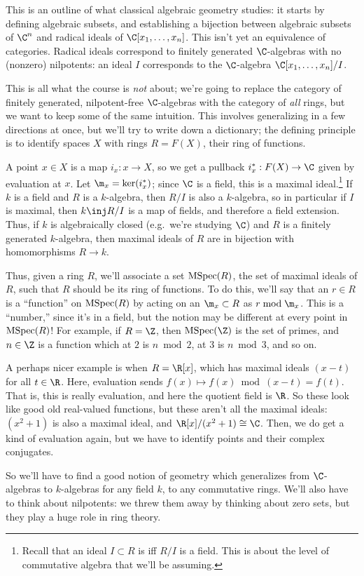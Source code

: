 This is an outline of what classical algebraic geometry studies: it starts by defining algebraic subsets, and
establishing a bijection between algebraic subsets of \(\C^n\) and radical ideals of \(\C[x_1,\dots,x_n]\). This
isn't yet an equivalence of categories. Radical ideals correspond to finitely generated \(\C\)-algebras with no
(nonzero) nilpotents: an ideal \(I\) corresponds to the \(\C\)-algebra \(\C[x_1,\dots,x_n]/I\).

This is all what the course is \emph{not} about; we're going to replace the category of finitely generated,
nilpotent-free \(\C\)-algebras with the category of \emph{all} rings, but we want to keep some of the same
intuition. This involves generalizing in a few directions at once, but we'll try to write down a dictionary; the
defining principle is to identify spaces \(X\) with rings \(R = F(X)\), their ring of functions.

A point \(x\in X\) is a map \(i_x:x\to X\), so we get a pullback \(i_x^*:F(X)\to\C\) given by evaluation at \(x\).
Let \(\m_x = \ker(i_x^*)\); since \(\C\) is a field, this is a maximal ideal.\footnote{Recall that an ideal
\(I\subset R\) is  iff \(R/I\) is a field. This is about the level of commutative algebra that we'll
be assuming.} If \(k\) is a field and \(R\) is a \(k\)-algebra, then \(R/I\) is also a \(k\)-algebra, so in
particular if \(I\) is maximal, then \(k\inj R/I\) is a map of fields, and therefore a field extension.  Thus, if
\(k\) is algebraically closed (e.g.\ we're studying \(\C\)) and \(R\) is a finitely generated \(k\)-algebra, then
maximal ideals of \(R\) are in bijection with homomorphisms \(R\to k\).

Thus, given a ring \(R\), we'll associate a set \(\operatorname{MSpec}(R)\), the set of maximal ideals of \(R\), such that \(R\)
should be its ring of functions. To do this, we'll say that an \(r\in R\) is a ``function'' on \(\operatorname{MSpec}(R)\) by
acting on an \(\m_x\subset R\) as \(r\bmod\m_x\). This is a ``number,'' since it's in a field, but the notion may
be different at every point in \(\operatorname{MSpec}(R)\)! For example, if \(R = \Z\), then \(\MSpec(\Z)\) is the set of primes,
and \(n\in\Z\) is a function which at \(2\) is \(n\bmod 2\), at \(3\) is \(n\bmod 3\), and so on.

A perhaps nicer example is when \(R = \R[x]\), which has maximal ideals \((x-t)\) for all \(t\in\R\). Here,
evaluation sends \(f(x)\mapsto f(x)\bmod (x-t) = f(t)\). That is, this is really evaluation, and here the quotient
field is \(\R\). So these look like good old real-valued functions, but these aren't all the maximal ideals:
\((x^2+1)\) is also a maximal ideal, and \(\R[x]/(x^2+1) \cong \C\). Then, we do get a kind of evaluation again,
but we have to identify points and their complex conjugates.

So we'll have to find a good notion of geometry which generalizes from \(\C\)-algebras to \(k\)-algebras for any
field \(k\), to any commutative rings. We'll also have to think about nilpotents: we threw them away by thinking
about zero sets, but they play a huge role in ring theory.
